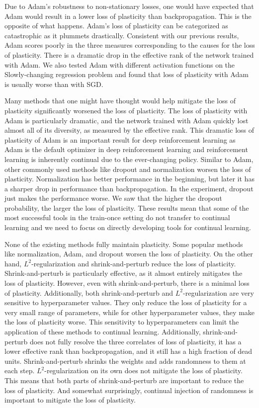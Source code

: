 \documentclass[review, number,3p]{elsarticle}
\begin{document}
Due to Adam's robustness to non-stationary losses, one would have expected that Adam would result in a lower loss of plasticity than backpropagation.
This is the opposite of what happens.
Adam's loss of plasticity can be categorized as catastrophic as it plummets drastically.
Consistent with our previous results, Adam scores poorly in the three measures corresponding to the causes for the loss of plasticity. 
There is a dramatic drop in the effective rank of the network trained with Adam.
We also tested Adam with different activation functions on the Slowly-changing regression problem and found that loss of plasticity with Adam is usually worse than with SGD.

Many methods that one might have thought would help mitigate the loss of plasticity significantly worsened the loss of plasticity.
The loss of plasticity with Adam is particularly dramatic, and the network trained with Adam quickly lost almost all of its diversity, as measured by the effective rank.
This dramatic loss of plasticity of Adam is an important result for deep reinforcement learning as Adam is the default optimizer in deep reinforcement learning and reinforcement learning is inherently continual due to the ever-changing policy.
Similar to Adam, other commonly used methods like dropout and normalization worsen the loss of plasticity.
Normalization has better performance in the beginning, but later it has a sharper drop in performance than backpropagation.
In the experiment, dropout just makes the performance worse.
We saw that the higher the dropout probability, the larger the loss of plasticity.
These results mean that some of the most successful tools in the train-once setting do not transfer to continual learning and we need to focus on directly developing tools for continual learning.

None of the existing methods fully maintain plasticity.
Some popular methods like normalization, Adam, and dropout worsen the loss of plasticity.
On the other hand, $L^2$-regularization and shrink-and-perturb reduce the loss of plasticity.
Shrink-and-perturb is particularly effective, as it almost entirely mitigates the loss of plasticity.
However, even with shrink-and-perturb, there is a minimal loss of plasticity.
Additionally, both shrink-and-perturb and $L^2$-regularization are very sensitive to hyperparameter values.
They only reduce the loss of plasticity for a very small range of parameters, while for other hyperparameter values, they make the loss of plasticity worse.
This sensitivity to hyperparameters can limit the application of these methods to continual learning.
Additionally, shrink-and-perturb does not fully resolve the three correlates of loss of plasticity, it has a lower effective rank than backpropagation, and it still has a high fraction of dead units.
Shrink-and-perturb shrinks the weights and adds randomness to them at each step.
$L^2$-regularization on its own does not mitigate the loss of plasticity.
This means that both parts of shrink-and-perturb are important to reduce the loss of plasticity.
And somewhat surprisingly, continual injection of randomness is important to mitigate the loss of plasticity.
\end{document}
